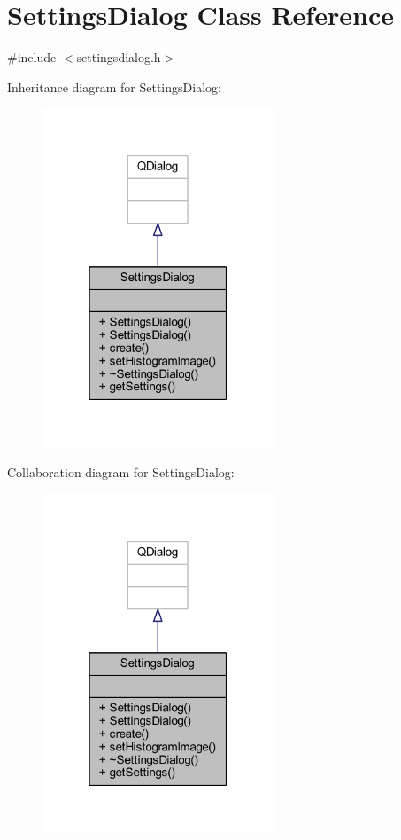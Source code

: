 \hypertarget{class_settings_dialog}{}\section{Settings\+Dialog Class Reference}
\label{class_settings_dialog}


{\ttfamily \#include $<$settingsdialog.\+h$>$}



Inheritance diagram for Settings\+Dialog\+:
\nopagebreak
\begin{figure}[H]
\begin{center}
\leavevmode
\includegraphics[width=196pt]{class_settings_dialog__inherit__graph}
\end{center}
\end{figure}


Collaboration diagram for Settings\+Dialog\+:
\nopagebreak
\begin{figure}[H]
\begin{center}
\leavevmode
\includegraphics[width=196pt]{class_settings_dialog__coll__graph}
\end{center}
\end{figure}

